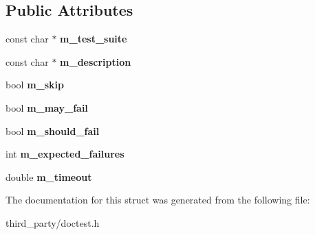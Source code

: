 \subsection*{Public Attributes}
\begin{DoxyCompactItemize}
\item 
\mbox{\label{structdoctest_1_1detail_1_1_test_suite_ab6260436f6fd52d473c0020ff916753c}} 
const char $\ast$ {\bfseries m\+\_\+test\+\_\+suite}
\item 
\mbox{\label{structdoctest_1_1detail_1_1_test_suite_a0458cf84f4f2d308162b26c95a1bbbce}} 
const char $\ast$ {\bfseries m\+\_\+description}
\item 
\mbox{\label{structdoctest_1_1detail_1_1_test_suite_a82ecf10ca3db6bff60a087378267caea}} 
bool {\bfseries m\+\_\+skip}
\item 
\mbox{\label{structdoctest_1_1detail_1_1_test_suite_aeaf438e6731c002c2447e8e87c46c82b}} 
bool {\bfseries m\+\_\+may\+\_\+fail}
\item 
\mbox{\label{structdoctest_1_1detail_1_1_test_suite_a3c5953ed157cfc68dfc37cce66fb4103}} 
bool {\bfseries m\+\_\+should\+\_\+fail}
\item 
\mbox{\label{structdoctest_1_1detail_1_1_test_suite_ab0167ce62046912d83780302cb86adca}} 
int {\bfseries m\+\_\+expected\+\_\+failures}
\item 
\mbox{\label{structdoctest_1_1detail_1_1_test_suite_a430d6e400dd91b9a21c7bb06ede81ec9}} 
double {\bfseries m\+\_\+timeout}
\end{DoxyCompactItemize}


The documentation for this struct was generated from the following file\+:\begin{DoxyCompactItemize}
\item 
third\+\_\+party/doctest.\+h\end{DoxyCompactItemize}
